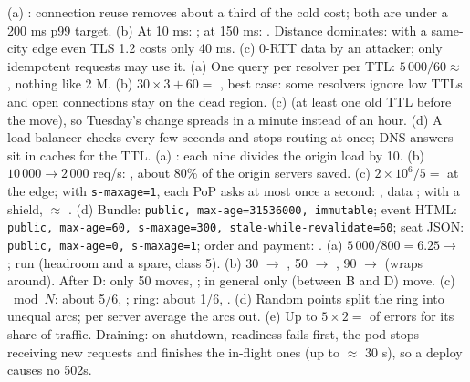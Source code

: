  (a) : connection reuse removes about a third of the cold cost; both are under a 200 ms p99 target. (b) At 10 ms: ; at 150 ms: . Distance dominates: with a same-city edge even TLS 1.2 costs only 40 ms. (c) 0-RTT data  by an attacker; only idempotent requests may use it.
 (a) One query per resolver per TTL: $5\,000 / 60 \approx$ , nothing like 2 M. (b) $30 \times 3 + 60 =$ , best case: some resolvers ignore low TTLs and open connections stay on the dead region. (c)  (at least one old TTL before the move), so Tuesday's change spreads in a minute instead of an hour. (d) A load balancer checks every few seconds and stops routing at once; DNS answers sit in caches for the TTL.
 (a) : each nine divides the origin load by 10. (b) $10\,000 \to 2\,000$ req/s: , about 80\% of the origin servers saved. (c) $2 \times 10^6 / 5 =$  at the edge; with \texttt{s-maxage=1}, each PoP asks at most once a second: , data ; with a shield, $\approx$ . (d) Bundle: \texttt{public, max-age=31536000, immutable}; event HTML: \texttt{public, max-age=60, s-maxage=300, stale-while-revalidate=60}; seat JSON: \texttt{public, max-age=0, s-maxage=1}; order and payment: .
 (a) $5\,000/800 = 6.25 \to$ ; run  (headroom and a spare, class 5). (b) 30 $\to$ , 50 $\to$ , 90 $\to$  (wraps around). After D: only 50 moves, ; in general only  (between B and D) move. (c) $\bmod N$: about 5/6, ; ring: about 1/6, . (d) Random points split the ring into unequal arcs;  per server average the arcs out. (e) Up to $5 \times 2 =$  of errors for its share of traffic. Draining: on shutdown, readiness fails first, the pod stops receiving new requests and finishes the in-flight ones (up to $\approx$ 30 s), so a deploy causes no 502s.
